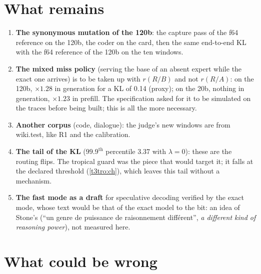 \section{What remains}\label{t3sno:sec:reste}

\begin{enumerate}
\item \textbf{The synonymous mutation of the 120b}: the capture pass of the f64 reference on the 120b, the coder on the card, then the same end-to-end KL with the f64 reference of the 120b on the ten windows.
\item \textbf{The mixed miss policy} (serving the base of an absent expert while the exact one arrives) is to be taken up with $r(R/B)$ and not $r(R/A)$: on the 120b, $\times 1.28$ in generation for a KL of \num{0.14} (proxy); on the 20b, nothing in generation, $\times 1.23$ in prefill. The specification asked for it to be simulated on the traces before being built; this is all the more necessary.
\item \textbf{Another corpus} (code, dialogue): the judge's new windows are from wiki.test, like R1 and the calibration.
\item \textbf{The tail of the KL} ($99.9^{\text{th}}$ percentile \num{3.37} with $\lambda = 0$): these are the routing flips. The tropical guard was the piece that would target it; it falls at the declared threshold (\cref{t3tro:ch}), which leaves this tail without a mechanism.
\item \textbf{The fast mode as a draft} for speculative decoding verified by the exact mode, whose text would be that of the exact model to the bit: an idea of Stone's (``un genre de puissance de raisonnement différent'', \emph{a different kind of reasoning power}), not measured here.
\end{enumerate}

\section{What could be wrong}\label{t3sno:sec:faux}

